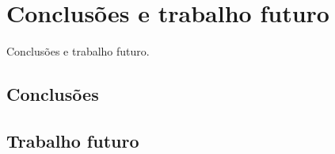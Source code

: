 \chapter{Conclusões e trabalho futuro}
Conclusões e trabalho futuro.

\section{Conclusões}

\section{Trabalho futuro}
